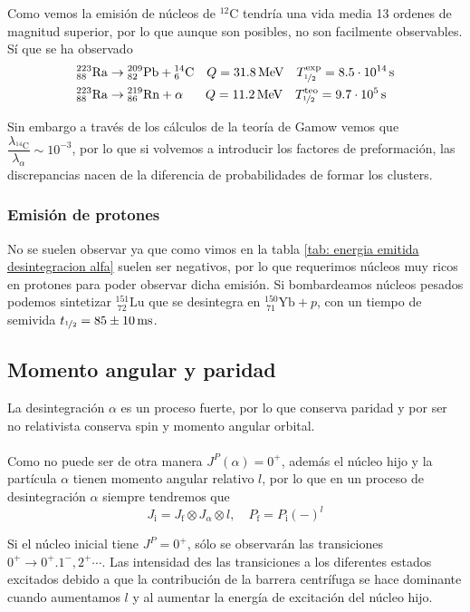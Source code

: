 Como vemos la emisión de núcleos de $^{12}\mathrm{C}$ tendría una vida media 13 ordenes de magnitud superior, por lo que aunque son posibles, no son facilmente observables. Sí que se ha observado
\begin{equation*}
\begin{aligned}
{}^{223}_{88}\text{Ra} &\to {}^{209}_{82}\text{Pb} + {}^{14}_{6}\text{C} 
\quad Q = 31.8 \, \text{MeV} \quad T_{\nicefrac{1}{2}}^{\text{exp}} = 8.5 \cdot 10^{14} \, \text{s} \\
{}^{223}_{88}\text{Ra} &\to {}^{219}_{86}\text{Rn} + \alpha 
\quad \ \, \; Q = 11.2 \, \text{MeV} \quad T_{\nicefrac{1}{2}}^{\text{teo}} = 9.7 \cdot 10^{5} \, \text{s}
\end{aligned}
\end{equation*}

Sin embargo a través de los cálculos de la teoría de Gamow vemos que $\dfrac{\lambda_{^{14}\mathrm{C}}}{\lambda_\alpha}\sim 10^{-3}$, por lo que si volvemos a introducir los factores de preformación, las discrepancias nacen de la diferencia de probabilidades de formar los clusters.
\subsubsection{Emisión de protones}
No se suelen observar ya que como vimos en la tabla \ref{tab: energia emitida desintegracion alfa} suelen ser negativos, por lo que requerimos núcleos muy ricos en protones para poder observar dicha emisión. Si bombardeamos núcleos pesados podemos sintetizar $^{151} _{\ 72}\mathrm{Lu}$ que se desintegra en $^{150} _{\ 71}\mathrm{Yb}+p$, con un tiempo de semivida $t_{\nicefrac{1}{2}}=\unit[85\pm 10]{ms}$.

\subsection{Momento angular y paridad}

La desintegración $\alpha$ es un proceso fuerte, por lo que conserva paridad y por ser no relativista conserva spin y momento angular orbital.\\\\
Como no puede ser de otra manera $J^P(\alpha)=0^+$, además el núcleo hijo y la partícula $\alpha$ tienen momento angular relativo $l$, por lo que en un proceso de desintegración $\alpha$ siempre tendremos que 
\begin{equation*}
    J_\mathrm{i}=J_\mathrm{f}\otimes J_\alpha \otimes l, \quad P_\mathrm{f}= P_\mathrm{i}(-)^l
\end{equation*}

Si el núcleo inicial tiene $J^P=0^+$, sólo se observarán las transiciones $0^+\longrightarrow 0^+.1^-,2^+\cdots$. Las intensidad des las transiciones a los diferentes estados excitados debido a que la contribución de la barrera centrífuga se hace dominante cuando aumentamos $l$ y al aumentar la energía de excitación del núcleo hijo.